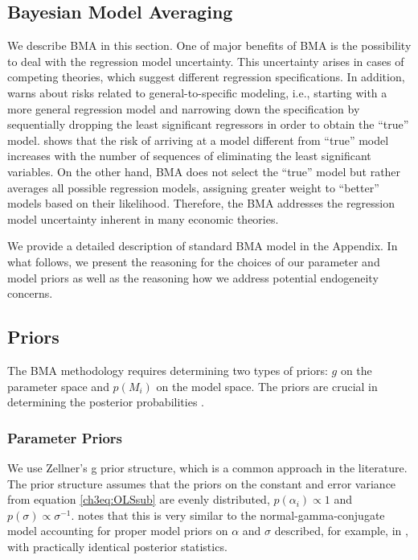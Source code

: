 \begin{refsection}
\section{Bayesian Model Averaging}
\label{ch3sec:BMA}
We describe \ac{BMA} in this section. %
One of major benefits of \ac{BMA} is the possibility to deal with the regression model uncertainty. This uncertainty arises in cases of competing theories, which suggest different regression specifications. In addition, \textcite{Koop2003} warns about risks related to general-to-specific modeling, i.e., starting with a more general regression model and narrowing down the specification by sequentially dropping the least significant regressors in order to obtain the ``true'' model. \textcite{Koop2003} shows that the risk of arriving at a model different from ``true'' model increases with the number of sequences of eliminating the least significant variables. On the other hand, BMA does not select the ``true'' model but rather averages all possible regression models, assigning greater weight to ``better'' models based on their likelihood. Therefore, the \ac{BMA} addresses the regression model uncertainty inherent in many economic theories. 

We provide a detailed description of standard BMA model in the Appendix. In what follows, we present the reasoning for the choices of our parameter and model priors as well as the reasoning how we address potential endogeneity concerns. 

\subsection*{Priors}
\label{ch3sec:priors}
The \ac{BMA} methodology requires determining two types of priors: $g$ on the parameter space and $p(M_{i})$ on the model space. The priors are crucial in determining the posterior probabilities \parencite{FeldkircherZeugner2009,CicconeJarocinski2010,Liangetal2008}.

\subsubsection*{Parameter Priors}
We use Zellner's g prior structure, which is a common approach in the literature. The prior structure assumes that the priors on the constant and error variance from equation \ref{ch3eq:OLSsub} are evenly distributed, $p(\alpha_{i}) \propto 1$ and $p(\sigma) \propto \sigma^{-1}$. \textcite{Zeugner2011} notes that this is very similar to the normal-gamma-conjugate model accounting for proper model priors on $\alpha$ and $\sigma$ described, for example, in \textcite{Koop2003}, with practically identical posterior statistics. 


\end{refsection}

